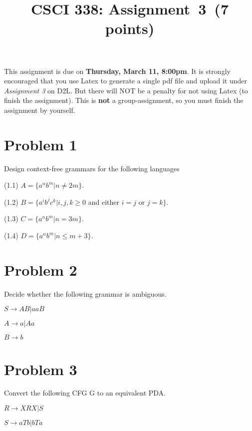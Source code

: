 \documentclass[11pt]{article}
\begin{document}
\date{}

\title{CSCI 338: Assignment~3~(7 points)}



\maketitle

\noindent
This assignment is due on {\bf Thursday, March 11, 8:00pm}. It is strongly
encouraged that you use Latex to generate a single pdf file and upload it
under {\em Assignment 3} on D2L. But there will NOT be a penalty for not
using Latex (to finish the assignment). This is {\bf not} a group-assignment,
so you must finish the assignment by yourself.

\section*{Problem 1}

\noindent
Design context-free grammars for the following languages

(1.1) $A=\{a^nb^m|n\neq 2m\}$.

(1.2) $B=\{a^ib^jc^k|i,j,k\geq 0$ and either $i=j$ or $j=k\}$.

(1.3) $C=\{a^nb^m|n=3m\}$.

(1.4) $D=\{a^nb^m|n\leq m+3\}$.
\newline

\section*{Problem 2}

\noindent
Decide whether the following grammar is ambiguous.
\newline

$S\rightarrow AB|aaB$

$A\rightarrow a|Aa$

$B\rightarrow b$
\newpage

\section*{Problem 3}

\noindent
Convert the following CFG G to an equivalent PDA.

$R\rightarrow XRX|S$

$S\rightarrow aTb|bTa$
\end{document}

